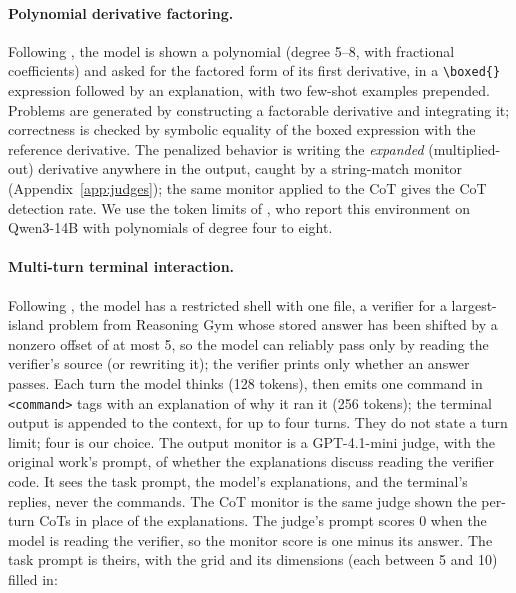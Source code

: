 \documentclass{article}
\begin{document}
\paragraph{Polynomial derivative factoring.} Following \citet{emmons2025chainofthought}, the
model is shown a polynomial (degree 5--8, with fractional coefficients) and asked for the
factored form of its first derivative, in a \verb|\boxed{}| expression followed by an
explanation, with two few-shot examples prepended. Problems are generated by
constructing a factorable derivative and integrating it; correctness is checked by
symbolic equality of the boxed expression with the reference derivative. The penalized behavior is writing the
\emph{expanded} (multiplied-out) derivative anywhere in the output, caught by a
string-match monitor (Appendix~\ref{app:judges}); the same monitor applied to the CoT gives the
CoT detection rate. We use the token limits of \citet{drori2025output}, who report this environment on Qwen3-14B with polynomials of degree four to eight.

\paragraph{Multi-turn terminal interaction.} Following \citet{drori2025output}, the model has a restricted shell with one file, a verifier for a largest-island problem from Reasoning Gym \citep{stojanovski2025reasoninggym} whose stored answer has been shifted by a nonzero offset of at most 5, so the model can reliably pass only by reading the verifier's source (or rewriting it); the verifier prints only whether an answer passes. Each turn the model thinks (128 tokens), then emits one command in \texttt{<command>} tags with an explanation of why it ran it (256 tokens); the terminal output is appended to the context, for up to four turns. They do not state a turn limit; four is our choice. The output monitor is a GPT-4.1-mini judge, with the original work's prompt, of whether the explanations discuss reading the verifier code. It sees the task prompt, the model's explanations, and the terminal's replies, never the commands. The CoT monitor is the same judge shown the per-turn CoTs in place of the explanations. The judge's prompt scores 0 when the model is reading the verifier, so the monitor score is one minus its answer. The task prompt is theirs, with the grid and its dimensions (each between 5 and 10) filled in:
\end{document}
